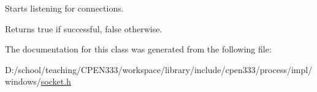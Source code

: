 Starts listening for connections. 

\begin{DoxyReturn}{Returns}
true if successful, false otherwise. 
\end{DoxyReturn}


The documentation for this class was generated from the following file\+:\begin{DoxyCompactItemize}
\item 
D\+:/school/teaching/\+C\+P\+E\+N333/workspace/library/include/cpen333/process/impl/windows/\hyperlink{impl_2windows_2socket_8h}{socket.\+h}\end{DoxyCompactItemize}
